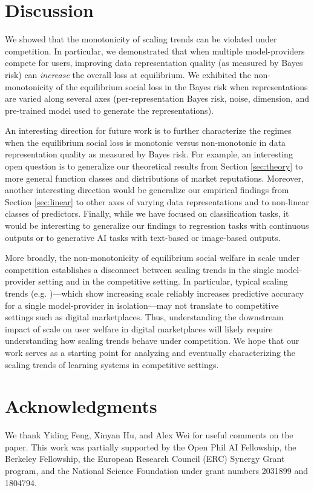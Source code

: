 \documentclass[letterpaper,11pt]{article}
\theoremstyle{plain}
\begin{document}
\section{Discussion} 

We showed that the monotonicity of scaling trends can be violated under competition. In particular, we demonstrated that when multiple model-providers compete for users, improving data representation quality (as measured by Bayes risk) can \textit{increase} the overall loss at equilibrium. We exhibited the non-monotonicity of the equilibrium social loss in the Bayes risk when representations are varied along several axes (per-representation Bayes risk, noise, dimension, and pre-trained model used to generate the representations). 

An interesting direction for future work is to further characterize the regimes when the equilibrium social loss is monotonic versus non-monotonic in data representation quality as measured by Bayes risk. For example, an interesting open question is to generalize our theoretical results from Section \ref{sec:theory} to more general function classes and distributions of market reputations. Moreover, another interesting direction would be generalize our empirical findings from Section \ref{sec:linear} to other axes of varying data representations and to non-linear classes of predictors. Finally, while we have focused on classification tasks, it would be interesting to generalize our findings to regression tasks with continuous outputs or to generative AI tasks with text-based or image-based outputs. 

More broadly, the non-monotonicity of equilibrium social welfare in scale under competition establishes a disconnect between scaling trends in the single model-provider setting and in the competitive setting. In particular, typical scaling trends (e.g. \citep{K20, SK20, B21, H22, hernandez2021scaling})---which show increasing scale reliably increases predictive accuracy for a single model-provider in isolation---may not translate to competitive settings such as digital marketplaces. Thus, understanding the downstream impact of scale on user welfare in digital marketplaces will likely require understanding how scaling trends behave under competition. We hope that our work serves as a starting point for analyzing and eventually characterizing the scaling trends of learning systems in competitive settings.

\section{Acknowledgments}
We thank Yiding Feng, Xinyan Hu, and Alex Wei for useful comments on the paper. This work was partially supported by the Open Phil AI Fellowship, the Berkeley Fellowship, the European Research Council (ERC) Synergy Grant program, and the National Science Foundation under grant numbers 2031899 and 1804794. 
\end{document}
